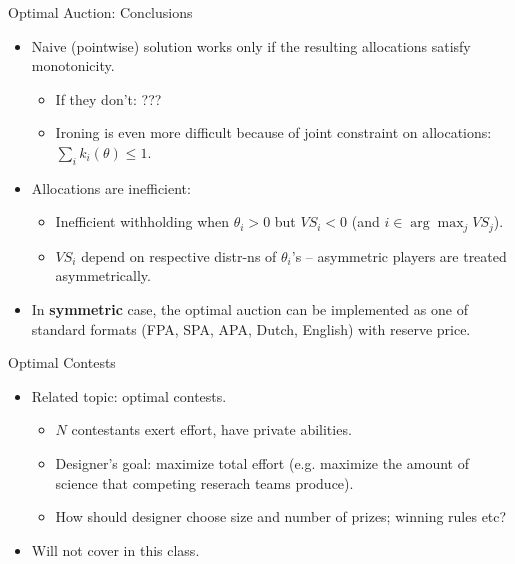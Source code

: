 \documentclass[english,10pt
,aspectratio=169
]{beamer}
\begin{document}
\begin{frame}{Optimal Auction: Conclusions}
\begin{itemize}
	\item Naive (pointwise) solution works only if the resulting allocations satisfy monotonicity.
	\begin{itemize}
		\item If they don't: ???
		\item Ironing is even more difficult because of joint constraint on allocations: $\sum_i k_i (\theta) \leq 1$.
	\end{itemize}
	\item Allocations are inefficient:
	\begin{itemize}
		\item Inefficient withholding when $\theta_i > 0$ but $VS_i < 0$ (and $i \in \arg \max_j VS_j$).
		\item $VS_i$ depend on respective distr-ns of $\theta_i$'s -- asymmetric players are treated asymmetrically.
	\end{itemize}
	\item In \textbf{symmetric} case, the optimal auction can be implemented as one of standard formats (FPA, SPA, APA, Dutch, English) with reserve price.
\end{itemize}
\end{frame}


\begin{frame}{Optimal Contests}
\begin{itemize}
	\item Related topic: optimal contests.
	\begin{itemize}
		\item $N$ contestants exert effort, have private abilities.
		\item Designer's goal: maximize total effort (e.g. maximize the amount of science that competing reserach teams produce).
		\item How should designer choose size and number of prizes; winning rules etc? 
	\end{itemize}
	\item Will not cover in this class.
\end{itemize}
\end{frame}
\end{document}
